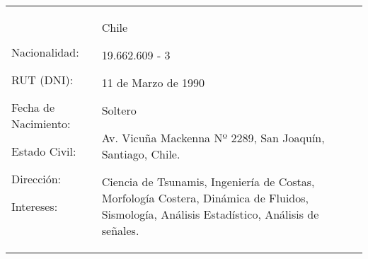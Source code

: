 

\begin{tabularx}{\textwidth}{p{4cm}X X@{}} %
Nacionalidad: \par
RUT (DNI): \par
Fecha de Nacimiento: \par
Estado Civil:  \par
Dirección: \par
Intereses:
&
Chile \par
19.662.609 - 3 \par
11 de Marzo de 1990 \par
Soltero \par
Av. Vicu\~{n}a Mackenna Nº 2289, San Joaquín, Santiago, Chile.\par
Ciencia de Tsunamis, Ingeniería de Costas, Morfología Costera, Dinámica de Fluidos, Sismología, Análisis Estadístico, Análisis de señales. 
\\
\end{tabularx}
